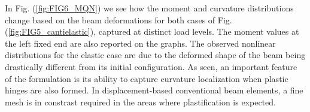 \begin{figure*}[b]
	\centering
	\qquad
	\caption{Geometrically nonlinear analyses of cantilever.}%
	\label{fig:FIG5_cantielastic}%
\end{figure*}

\begin{table*}[t]\centering
	\caption{Comparison of tip normalized displacements for different load 
	levels
		for elastic response.}
	\noindent{}
	\label{table:table1}
\end{table*}

In Fig. (\ref{fig:FIG6_MQN}) we see how the moment and curvature
distributions change based on the beam deformations for both cases of Fig.
(\ref{fig:FIG5_cantielastic}), captured at distinct
load levels. The moment values at the left fixed end are also reported on
the graphs. The observed nonlinear distributions for the elastic case are due 
to the
deformed shape of the beam being drastically different from its initial
configuration. As seen, an important feature of the formulation is its ability 
to capture curvature localization when plastic hinges are also formed. In 
displacement-based conventional beam elements, a fine mesh is in constrast 
required in the areas where plastification is expected.

